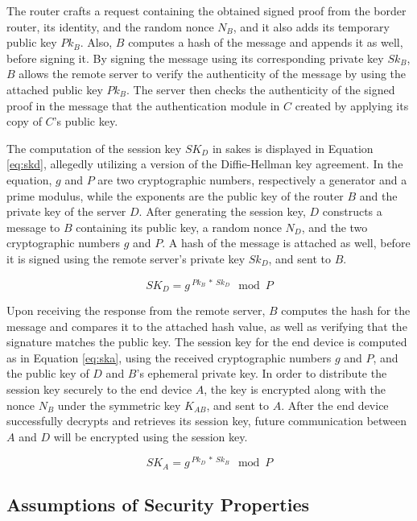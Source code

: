 The router crafts a request containing the obtained signed proof from the border router, its identity, and the random nonce $N_B$, and it also adds its temporary public key $Pk_B$. Also, $B$ computes a hash of the message and appends it as well, before signing it. By signing the message using its corresponding private key $Sk_B$, $B$ allows the remote server to verify the authenticity of the message by using the attached public key $Pk_B$. The server then checks the authenticity of the signed proof in the message that the authentication module in $C$ created by applying its copy of $C$'s public key.

The computation of the session key $SK_D$ in \gls{sakes} is displayed in Equation \ref{eq:skd}, allegedly utilizing a version of the Diffie-Hellman key agreement. In the equation, $g$ and $P$ are two cryptographic numbers, respectively a generator and a prime modulus, while the exponents are the public key of the router $B$ and the private key of the server $D$. After generating the session key, $D$ constructs a message to $B$ containing its public key, a random nonce $N_D$, and the two cryptographic numbers $g$ and $P$. A hash of the message is attached as well, before it is signed using the remote server's private key $Sk_D$, and sent to $B$. 

\begin{equation}
\label{eq:skd}
SK_D = g^{\ Pk_{B}\ *\ Sk_D} \mod P
\end{equation}

Upon receiving the response from the remote server, $B$ computes the hash for the message and compares it to the attached hash value, as well as verifying that the signature matches the public key. The session key for the end device is computed as in Equation \ref{eq:ska}, using the received cryptographic numbers $g$ and $P$, and the public key of $D$ and $B$'s ephemeral private key. In order to distribute the session key securely to the end device $A$, the key is encrypted along with the nonce $N_B$ under the symmetric key $K_{AB}$, and sent to $A$. After the end device successfully decrypts and retrieves its session key, future communication between $A$ and $D$ will be encrypted using the session key. 

\begin{equation}
\label{eq:ska}
SK_A = g^{\ Pk_{D}\ *\ Sk_B} \mod P
\end{equation}


\subsection{Assumptions of Security Properties}
\label{subsec:sakes-props}

